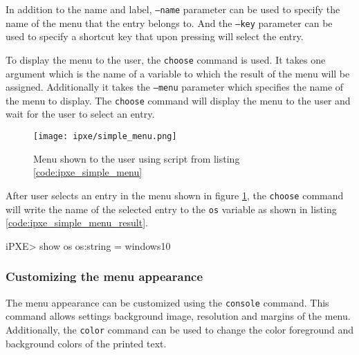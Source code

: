\documentclass[../main.tex]{subfiles}
\begin{document}
In addition to the name and label, \texttt{--name} parameter can be used to specify the name of the menu that the entry belongs to. And the \texttt{--key}
parameter can be used to specify a shortcut key that upon pressing will select the entry.


To display the menu to the user, the \texttt{choose} command is used.
It takes one argument which is the name of a variable to which the result of the menu will be assigned.
Additionally it takes the \texttt{--menu} parameter which specifies the name of the menu to display.
The \texttt{choose} command will display the menu to the user and wait for the user to select an entry.

\begin{listing}[H]
  \caption{Simple iPXE menu for choosing OS to boot}
  \label{code:ipxe_simple_menu}
\end{listing}

\begin{figure}[H]
  \centering
  \texttt{[image: ipxe/simple\_menu.png]}
  \caption{Menu shown to the user using script from listing \ref{code:ipxe_simple_menu}}
  \label{fig:ipxe_simple_menu}
\end{figure}

After user selects an entry in the menu shown in figure \ref{fig:ipxe_simple_menu}, the \texttt{choose} command will write the name of the selected entry to the \texttt{os} variable
as shown in listing \ref{code:ipxe_simple_menu_result}.

\begin{listing}[H]
  \begin{textcode}
    iPXE> show os
    os:string = windows10
  \end{textcode}
  \caption{Contents of the \texttt{os} variable after selecting the \texttt{windows10} entry in the menu shown in figure \ref{fig:ipxe_simple_menu}}
  \label{code:ipxe_simple_menu_result}
\end{listing}

\subsubsection{Customizing the menu appearance}

The menu appearance can be customized using the \texttt{console} command.
This command allows settings background image, resolution and margins of the menu.
Additionally, the \texttt{color} command can be used to change the color foreground and background colors of the printed text.
\end{document}
